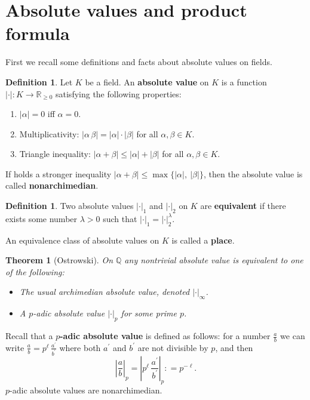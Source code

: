\documentclass{article}
\newtheorem{theorem}[proposition]{Theorem}
\theoremstyle{definition}
\newtheorem{definition}[proposition]{Definition}
\newcommand{\term}{\textbf}
\newcommand{\dfn}{\mathrel{\mathop:}=}
\newcommand{\QQ}{\mathbb{Q}}
\begin{document}
\section{Absolute values and product formula}

First we recall some definitions and facts about absolute values on fields.

\begin{definition}
  Let $K$ be a field. An \term{absolute value} on $K$ is a function
  $|\cdot|\colon K\to \mathbb{R}_{\ge 0}$ satisfying the following properties:

  \begin{enumerate}
  \item $|\alpha| = 0$ iff $\alpha = 0$.

  \item Multiplicativity: $|\alpha\,\beta| = |\alpha|\cdot |\beta|$ for all
    $\alpha,\beta\in K$.

  \item Triangle inequality: $|\alpha + \beta| \le |\alpha| + |\beta|$ for all
    $\alpha,\beta\in K$.
  \end{enumerate}

  If holds a stronger inequality
  $|\alpha + \beta| \le \max \{ |\alpha|, ~ |\beta| \}$, then the absolute value
  is called \term{nonarchimedian}.
\end{definition}

\begin{definition}
  Two absolute values $|\cdot|_1$ and $|\cdot|_2$ on $K$ are \term{equivalent}
  if there exists some number $\lambda > 0$ such that
  $|\cdot|_1 = |\cdot|_2^\lambda$.

  An equivalence class of absolute values on $K$ is called a \term{place}.
\end{definition}

\begin{theorem}[Ostrowski]
  On $\QQ$ any nontrivial absolute value is equivalent to one of the following:

  \begin{itemize}
  \item The usual archimedian absolute value, denoted $|\cdot|_\infty$.

  \item A $p$-adic absolute value $|\cdot|_p$ for some prime $p$.
  \end{itemize}
\end{theorem}

Recall that a \term{$p$-adic absolute value} is defined as follows: for a number
$\frac{a}{b}$ we can write $\frac{a}{b} = p^\ell \, \frac{a^\prime}{b^\prime}$
where both $a^\prime$ and $b^\prime$ are not divisible by $p$, and then
$$\left|\frac{a}{b}\right|_p = \left|p^\ell \, \frac{a^\prime}{b^\prime}\right|_p \dfn p^{-\ell}.$$
$p$-adic absolute values are nonarchimedian.
\end{document}
